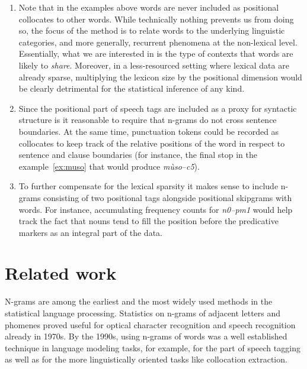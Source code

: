\documentclass[12pt]{article}
\begin{document}
\begin{enumerate}
\item Note that in the examples above words are never included as
  positional collocates to other words. While technically nothing
  prevents us from doing so, the focus of the method is to relate
  words to the underlying linguistic categories, and more generally,
  recurrent phenomena at the non-lexical level.  Essentially, what we
  are interested in is the type of contexts that words are likely to
  \textit{share}.  Moreover, in a less-resourced setting where lexical
  data are already sparse, multiplying the lexicon size by the
  positional dimension would be clearly detrimental for the
  statistical inference of any kind.
\item Since the positional part of speech tags are included as a proxy
  for syntactic structure is it reasonable to require that n-grams do
  not cross sentence boundaries.  At the same time, punctuation tokens
  could be recorded as collocates to keep track of the relative
  positions of the word in respect to sentence and clause boundaries
  (for instance, the final stop in the example~\ref{ex:muso} that would
  produce \textit{mùso--c5}).
\item To further compensate for the lexical sparsity it makes sense to
  include n-grams consisting of two positional tags alongside
  positional skipgrams with words. For instance, accumulating
  frequency counts for \textit{n0--pm1} would help track the
  fact that nouns tend to fill the position before the predicative
  markers as an integral part of the data.
\end{enumerate} 


\section{Related work}

N-grams are among the earliest and the most widely used methods in the
statistical language processing.  Statistics on n-grams of adjacent
letters and phomenes proved useful for optical character recognition
and speech recognition already in 1970s. By
the 1990s, using n-grams of words was a well established technique in
language modeling tasks, for example, for the part of speech
tagging as well as for the more linguistically
oriented tasks like collocation extraction.
\end{document}
